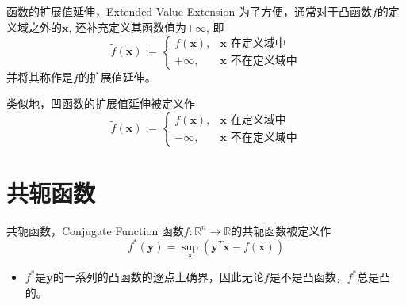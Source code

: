 \begin{frame}

\begin{block}{函数的扩展值延伸，Extended-Value Extension}
为了方便，通常对于凸函数$f$的定义域之外的$\mathbf{x}$, 还补充定义其函数值为$+\infty$, 即
$$\widetilde{f}(\mathbf{x}) := \begin{cases}
f(\mathbf{x}), & \mathbf{x} \text{ 在定义域中} \\
+\infty, & \mathbf{x} \text{ 不在定义域中}
\end{cases}$$
并将其称作是$f$的扩展值延伸。

\vspace{1em}

类似地，凹函数的扩展值延伸被定义作
$$\widetilde{f}(\mathbf{x}) := \begin{cases}
f(\mathbf{x}), & \mathbf{x} \text{ 在定义域中} \\
-\infty, & \mathbf{x} \text{ 不在定义域中}
\end{cases}$$
\end{block}

\end{frame}


\section{共轭函数}


\begin{frame}

\begin{block}{共轭函数，Conjugate Function}
函数$f: \mathbb{R}^n \to \mathbb{R}$的共轭函数被定义作
$$f^*(\mathbf{y}) = \sup\limits_{\mathbf{x}} \left( \mathbf{y}^T\mathbf{x} - f(\mathbf{x}) \right)$$

\begin{itemize}
\item $f^*$是$\mathbf{y}$的一系列的凸函数的逐点上确界，因此无论$f$是不是凸函数，$f^*$总是凸的。
\end{itemize}
\end{block}

\end{frame}


